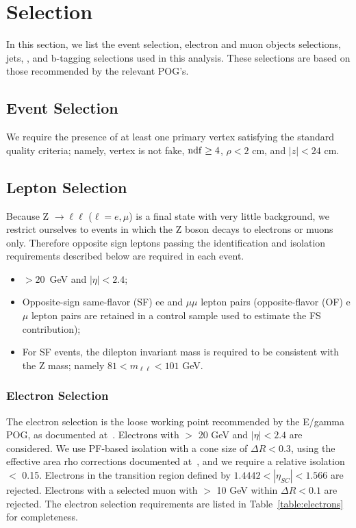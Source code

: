 \clearpage

\section{Selection}
\label{sec:eventSelection}

In this section, we list the event selection, electron and muon objects selections, jets, \MET, and b-tagging selections
used in this analysis. These selections are based on those recommended by the relevant POG's. 

\subsection{Event Selection}

We require the presence of at least one primary vertex satisfying the standard quality criteria; namely,
vertex is not fake, $\rm{ndf}\geq4$, $\rho<2$ cm, and $|z|<24$ cm.

\subsection{Lepton Selection}

Because Z $\rightarrow\ell\ell$ ($\ell=e,\mu$) is a final state with very little background,
we restrict ourselves to events in which the Z boson decays to electrons or muons only.
Therefore opposite sign leptons passing the identification and isolation requirements described below are required in each event.

\begin{itemize}
\item \pt $> 20$~GeV and $|\eta|<2.4$;
\item Opposite-sign same-flavor (SF) ee and $\mu\mu$ lepton pairs (opposite-flavor (OF) e$\mu$ lepton pairs are retained in a control 
  sample used to estimate the FS contribution);
\item For SF events, the dilepton invariant mass is required to be consistent with the Z mass; namely $81<m_{\ell\ell}<101$ GeV.
\end{itemize}

\subsubsection{Electron Selection}

The electron selection is the loose working point recommended by the E/gamma POG, as documented at~\cite{ref:Egamma}. 
Electrons with \pt $>$ 20 GeV and $|\eta|<2.4$ are considered.
We use PF-based isolation with a cone size of $\Delta R<0.3$, using the effective area rho corrections documented at~\cite{ref:Egammaiso},
and we require a relative isolation $<$ 0.15. 
Electrons in the transition region defined by $1.4442 < |\eta_{SC}| < 1.566$ are rejected.
Electrons with a selected muon with \pt $>$ 10 GeV within $\Delta R<0.1$ are rejected.
The electron selection requirements are listed in Table~\ref{table:electrons} for completeness.

